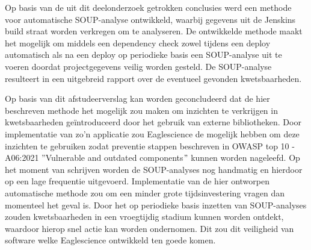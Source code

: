 Op basis van de uit dit deelonderzoek getrokken conclusies werd een methode voor automatische SOUP-analyse ontwikkeld, waarbij gegevens uit de Jenskins build straat worden verkregen om te analyseren. De ontwikkelde methode maakt het mogelijk om middels een dependency check zowel tijdens een deploy automatisch als na een deploy op  periodieke basis een SOUP-analyse uit te voeren doordat projectgegevens veilig worden gesteld. De SOUP-analyse resulteert in een uitgebreid rapport over de eventueel gevonden kwetsbaarheden.

Op basis van dit afstudeerverslag kan worden geconcludeerd dat de hier beschreven methode het mogelijk zou maken om inzichten te verkrijgen in kwetsbaarheden geïntroduceerd door het gebruik van externe bibliotheken. Door implementatie van zo’n applicatie zou Eaglescience de mogelijk hebben om deze inzichten te gebruiken zodat preventie stappen beschreven in OWASP top 10 - A06:2021 $”$Vulnerable and outdated components$"$ kunnen worden nageleefd. Op het moment van schrijven worden de SOUP-analyses nog handmatig en hierdoor op een lage frequentie uitgevoerd. Implementatie van de hier ontworpen automatische methode zou om een minder grote tijdsinvestering vragen dan momenteel het geval is. Door het op periodieke basis inzetten van SOUP-analyses zouden kwetsbaarheden in een vroegtijdig stadium kunnen worden ontdekt, waardoor hierop snel actie kan worden ondernomen. Dit zou dit veiligheid van software welke Eaglescience ontwikkeld ten goede komen.
